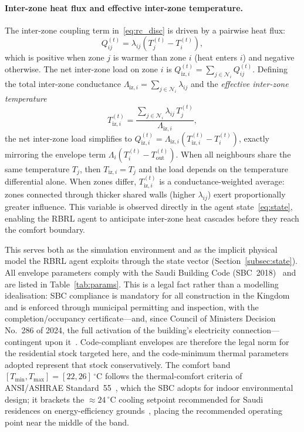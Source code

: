 \documentclass[3p,number]{elsarticle}
\newcommand{\Tmin}{T_{\min}}
\newcommand{\Tmax}{T_{\max}}
\newcommand{\Tout}{T_{\mathrm{out}}}
\newcommand{\lij}{\lambda_{ij}}
\newcommand{\Liz}[1]{\Lambda_{\mathrm{iz},#1}}
\newcommand{\Tiz}[1]{T_{\mathrm{iz},#1}}
\newcommand{\Qiz}[1]{Q_{\mathrm{iz},#1}}
\begin{document}
\paragraph{Inter-zone heat flux and effective inter-zone temperature.}
The inter-zone coupling term in~\eqref{eq:rc_disc} is driven by a pairwise heat flux:
\begin{equation}
  Q_{ij}^{(t)} = \lij\!\left(T_j^{(t)}-T_i^{(t)}\right),
  \label{eq:qij}
\end{equation}
which is positive when zone $j$ is warmer than zone $i$ (heat enters $i$) and negative otherwise.
The net inter-zone load on zone $i$ is $\Qiz{i}^{(t)}=\sum_{j\in\mathcal{N}_i}Q_{ij}^{(t)}$.
Defining the total inter-zone conductance $\Liz{i}=\sum_{j\in\mathcal{N}_i}\lij$ and the \emph{effective inter-zone temperature}
\begin{equation}
  \Tiz{i}^{(t)}
  =\frac{\displaystyle\sum_{j\in\mathcal{N}_i}\lij\,T_j^{(t)}}{\Liz{i}},
  \label{eq:tiz}
\end{equation}
the net inter-zone load simplifies to $\Qiz{i}^{(t)}=\Liz{i}\!\left(\Tiz{i}^{(t)}-T_i^{(t)}\right)$, exactly mirroring the envelope term $\Lambda_i(T_i^{(t)}-\Tout^{(t)})$.
When all neighbours share the same temperature $T_j$, then $\Tiz{i}=T_j$ and the load depends on the temperature differential alone.
When zones differ, $\Tiz{i}^{(t)}$ is a conductance-weighted average: zones connected through thicker shared walls (higher $\lij$) exert proportionally greater influence.
This variable is observed directly in the agent state~\eqref{eq:state}, enabling the RBRL agent to anticipate inter-zone heat cascades before they reach the comfort boundary.
 
This serves both as the simulation environment and as the implicit physical model the RBRL agent exploits through the state vector (Section~\ref{subsec:state}).
All envelope parameters comply with the Saudi Building Code (SBC~2018)~\cite{Alayed2021,AlReshidi2024} and are listed in Table~\ref{tab:params}. This is a legal fact rather than a modelling idealisation: SBC compliance is mandatory for all construction in the Kingdom and is enforced through municipal permitting and inspection, with the completion/occupancy certificate---and, since Council of Ministers Decision No.~286 of 2024, the full activation of the building's electricity connection---contingent upon it~\cite{SBCgov2024}. Code-compliant envelopes are therefore the legal norm for the residential stock targeted here, and the code-minimum thermal parameters adopted represent that stock conservatively. The comfort band $[\Tmin,\Tmax]{=}[22,26]\,^\circ$C follows the thermal-comfort criteria of ANSI/ASHRAE Standard~55~\cite{ASHRAE55_2023}, which the SBC adopts for indoor environmental design; it brackets the ${\approx}24\,^\circ$C cooling setpoint recommended for Saudi residences on energy-efficiency grounds~\cite{SEC2024}, placing the recommended operating point near the middle of the band.
 
\end{document}
